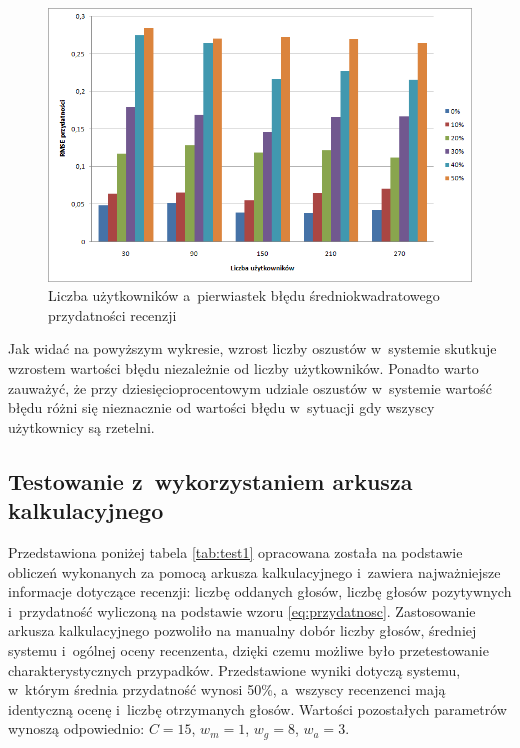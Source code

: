 \begin{figure}[h]
	\centering
	\includegraphics[width=\textwidth, keepaspectratio=true]{images/LiarsTest.png}
	\caption{Liczba użytkowników a~pierwiastek błędu średniokwadratowego przydatności recenzji}\label{fig:test3}
\end{figure}

Jak widać na powyższym wykresie, wzrost liczby oszustów w~systemie skutkuje wzrostem wartości błędu niezależnie od liczby użytkowników. Ponadto warto zauważyć, że przy dziesięcioprocentowym udziale oszustów w~systemie wartość błędu różni się nieznacznie od wartości błędu w~sytuacji gdy wszyscy użytkownicy są rzetelni.

\subsection{Testowanie z~wykorzystaniem arkusza kalkulacyjnego}

Przedstawiona poniżej tabela \ref{tab:test1} opracowana została na podstawie obliczeń wykonanych za pomocą arkusza kalkulacyjnego i~zawiera najważniejsze informacje dotyczące recenzji: liczbę oddanych głosów, liczbę głosów pozytywnych i~przydatność wyliczoną na podstawie wzoru \ref{eq:przydatnosc}. Zastosowanie arkusza kalkulacyjnego pozwoliło na manualny dobór liczby głosów, średniej systemu i~ogólnej oceny recenzenta, dzięki czemu możliwe było przetestowanie charakterystycznych przypadków. Przedstawione wyniki dotyczą systemu, w~którym średnia przydatność wynosi 50\%, a~wszyscy recenzenci mają identyczną ocenę i~liczbę otrzymanych głosów. Wartości pozostałych parametrów wynoszą odpowiednio: $C=15$, $w_{m}=1$, $w_{g}=8$, $w_{a}=3$.

